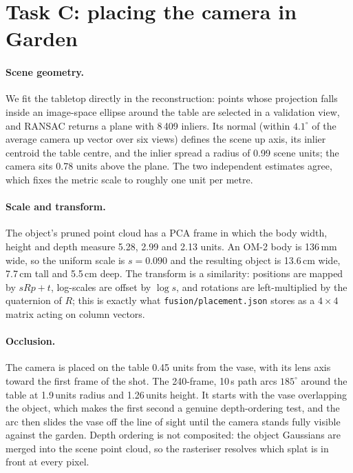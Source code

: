 \documentclass[10pt,twocolumn,letterpaper]{article}
\begin{document}
\section{Task C: placing the camera in Garden}

\paragraph{Scene geometry.} We fit the tabletop directly in the reconstruction: points whose
projection falls inside an image-space ellipse around the table are selected in a validation view,
and RANSAC returns a plane with 8\,409 inliers. Its normal (within $4.1^{\circ}$ of the average
camera up vector over six views) defines the scene up axis, its inlier centroid the table centre,
and the inlier spread a radius of 0.99 scene units; the camera sits 0.78 units above the plane.
The two independent estimates agree, which fixes the metric scale to roughly one unit per metre.

\paragraph{Scale and transform.} The object's pruned point cloud has a PCA frame in which the body
width, height and depth measure 5.28, 2.99 and 2.13 units. An OM-2 body is 136\,mm wide, so the
uniform scale is $s=0.090$ and the resulting object is 13.6\,cm wide, 7.7\,cm tall and 5.5\,cm deep.
The transform is a similarity: positions are mapped by $sR p + t$, log-scales are offset by
$\log s$, and rotations are left-multiplied by the quaternion of $R$; this is exactly what
\texttt{fusion/placement.json} stores as a $4\times4$ matrix acting on column vectors.

\paragraph{Occlusion.} The camera is placed on the table 0.45 units from the vase, with its lens
axis toward the first frame of the shot. The 240-frame, 10\,s path arcs $185^{\circ}$ around the
table at 1.9\,units radius and 1.26\,units height. It starts with the vase overlapping the object,
which makes the first second a genuine depth-ordering test, and the arc then slides the vase off
the line of sight until the camera stands fully visible against the garden. Depth ordering is not
composited: the object
Gaussians are merged into the scene point cloud, so the rasteriser resolves which splat is in
front at every pixel.
\end{document}
